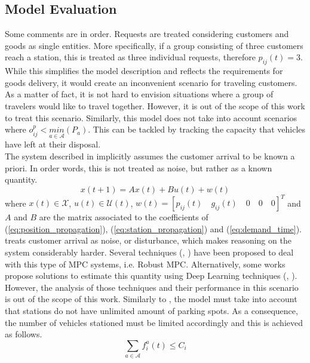 \subsection{Model Evaluation}
Some comments are in order. Requests are treated considering customers and goods as single entities. More specifically, if a group consisting of three customers reach a station, this is treated as three individual requests, therefore $p_{ij}(t) = 3$. While this simplifies the model description and reflects the requirements for goods delivery, it would create an inconvenient scenario for traveling customers. As a matter of fact, it is not hard to envision situations where a group of travelers would like to travel together. However, it is out of the scope of this work to treat this scenario. Similarly, this model does not take into account scenarios where $o^p_{ij} <\underset{ a \in \mathcal{A}}{min}(P_a)$. This can be tackled by tracking the capacity that vehicles have left at their disposal.\\
The system described in  implicitly assumes the customer arrival to be known a priori. In order words, this is not treated as noise, but rather as a known quantity. 
\begin{equation}
	x(t+1) = Ax(t) + Bu(t) + w(t)\label{eq:disturbed_mpc_formulation}
\end{equation}
where $x(t) \in \mathcal{X}$, $u(t) \in \mathcal{U}(t)$, $w(t) = [p_{ij}(t)\quad g_{ij}(t)\quad0\quad0 \quad0]^T$ and $A$ and $B$ are the matrix associated to the coefficients of (\ref{eq:position_propagation}), (\ref{eq:station_propagation}) and (\ref{eq:demand_time}). \\
 treats customer arrival as noise, or disturbance, which makes reasoning on the system considerably harder. Several techniques (\cite{Campo1987RobustMP}, \cite{LANGSON2004125}) have been proposed to deal with this type of MPC systems, i.e. Robust MPC. Alternatively, some works propose solutions to estimate this quantity using Deep Learning techniques (\cite{9202791}, \cite{8569427}).
However, the analysis of those techniques and their performance in this scenario is out of the scope of this work.
Similarly to , the model must take into account that stations do not have unlimited amount of parking spots. As a consequence, the number of vehicles stationed must be limited accordingly and this is achieved as follows. 
\begin{equation}
	\sum_{a \in \mathcal{A}}f^a_i(t) \leq C_i
	\label{eq:parking_limit}
\end{equation}
